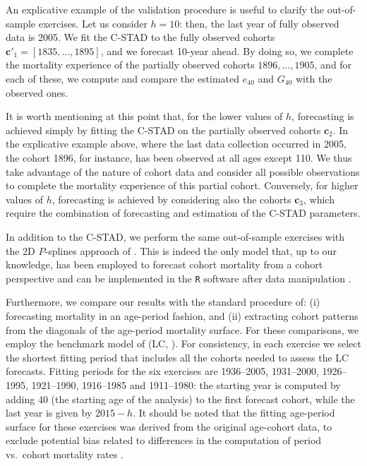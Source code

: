 \documentclass[11pt, a4paper]{article}
\begin{document}
An explicative example of the validation procedure is useful to clarify the out-of-sample exercises. Let us consider $h=10$: then, the last year of fully observed data is 2005. We fit the C-STAD to the fully observed cohorts {\color{red}$\bm{c}'_1=\left[1835,\dots,1895\right]$}, and we forecast 10-year ahead. By doing so, we complete the mortality experience of the partially observed cohorts $1896,\ldots,1905$, and for each of these, we compute and compare the estimated $e_{40}$ and $G_{40}$ with the observed ones. 

It is worth mentioning at this point that, for the lower values of $h$, forecasting is achieved simply by fitting the C-STAD on the partially observed cohorts $\bm{c}_2$. In the explicative example above, where the last data collection occurred in 2005, the cohort 1896, for instance, has been observed at all ages except 110. We thus take advantage of the nature of cohort data and consider all possible observations to complete the mortality experience of this partial cohort.  Conversely, for higher values of $h$, forecasting is achieved by considering also the cohorts $\bm{c}_3$, which require the combination of forecasting and estimation of the C-STAD parameters. 

In addition to the C-STAD, we perform the same out-of-sample exercises with the 2D $P$-splines approach of \cite{currie2004smoothing}. This is indeed the only model that, up to our knowledge, has been employed to forecast cohort mortality from a cohort perspective \citep{cmi2007stochastic} and can be implemented in the \texttt{R} software {\color{red} after data manipulation} \cite[in the \texttt{MortalitySmooth} package,][]{camarda2012mortalitysmooth}. 

{\color{red} Furthermore, we compare our results with the standard procedure of: (i) forecasting mortality in an age-period fashion, and (ii) extracting cohort patterns from the diagonals of the age-period mortality surface. For these comparisons, we employ the benchmark model of \citeauthor{lee1992modeling} (LC, \citeyear{lee1992modeling}). For consistency, in each exercise we select the shortest fitting period that includes all the cohorts needed to assess the LC forecasts. Fitting periods for the six exercises are 1936--2005, 1931--2000, 1926--1995, 1921--1990, 1916--1985 and 1911--1980: the starting year is computed by adding 40 (the starting age of the analysis) to the first forecast cohort, while the last year is given by $2015 - h$. It should be noted that the fitting age-period surface for these exercises was derived from the original age-cohort data, to exclude potential bias related to differences in the computation of period vs.~cohort mortality rates \cite[see][pp.~29--33]{wilmoth2017protocol}. \par
}
\end{document}

